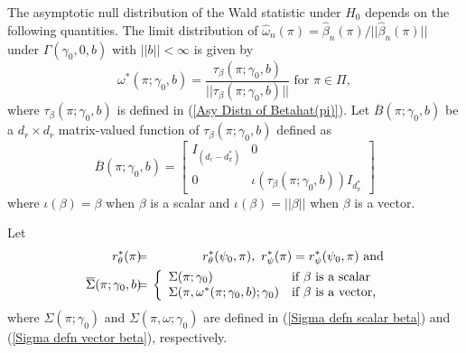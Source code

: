 \documentclass[12pt,titlepage,final,oneside,letterpaper]{article}
\begin{document}
\hspace{0.25in}The asymptotic null distribution of the Wald statistic under $%
H_{0}$ depends on the following quantities. The limit distribution of $%
\widehat{\omega }_{n}(\pi )=\widehat{\beta }_{n}(\pi )/||\widehat{\beta }%
_{n}(\pi )||$ under $\Gamma (\gamma _{0},0,b)$ with $||b||<\infty $ is given
by%
\begin{equation}
\omega ^{\ast }(\pi ;\gamma _{0},b)=\frac{\tau _{\beta }(\pi ;\gamma _{0},b)%
}{||\tau _{\beta }(\pi ;\gamma _{0},b)||}\text{ for }\pi \in \Pi ,
\label{Omegastar defn}
\end{equation}%
where $\tau _{\beta }(\pi ;\gamma _{0},b)$ is defined in (\ref{Asy Distn of
Betahat(pi)}). Let $\overline{B}(\pi ;\gamma _{0},b)$ be a $d_{r}\times
d_{r} $ matrix-valued function of $\tau _{\beta }(\pi ;\gamma _{0},b)$
defined as%
\begin{equation}
\overline{B}(\pi ;\gamma _{0},b)=\left[ 
\begin{array}{cc}
I_{(d_{r}-d_{\pi }^{\ast })} & 0 \\ 
0 & \iota (\tau _{\beta }(\pi ;\gamma _{0},b))I_{d_{\pi }^{\ast }}%
\end{array}%
\right]
\end{equation}%
where $\iota (\beta )=\beta $ when $\beta $ is a scalar and $\iota (\beta
)=||\beta ||$ when $\beta $ is a vector.

Let%
\begin{eqnarray}
r_{\theta }^{\ast }(\pi )\hspace{-0.08in} &=&\hspace{-0.08in}r_{\theta
}^{\ast }(\psi _{0},\pi ),\text{ }r_{\psi }^{\ast }(\pi )=r_{\psi }^{\ast
}(\psi _{0},\pi )\text{ and}  \notag \\
\overline{\Sigma }(\pi ;\gamma _{0},b)\hspace{-0.08in} &=&\hspace{-0.08in}%
\left\{ 
\begin{array}{ll}
\Sigma (\pi ;\gamma _{0}) & \text{if }\beta \text{ is a scalar} \\ 
\Sigma (\pi ,\omega ^{\ast }(\pi ;\gamma _{0},b);\gamma _{0}) & \text{if }%
\beta \text{ is a vector,}%
\end{array}%
\right.  \label{Sigmabar defn}
\end{eqnarray}%
where $\Sigma (\pi ;\gamma _{0})$ and $\Sigma (\pi ,\omega ;\gamma _{0})$
are defined in (\ref{Sigma defn scalar beta}) and (\ref{Sigma defn vector
beta}), respectively.
\end{document}
